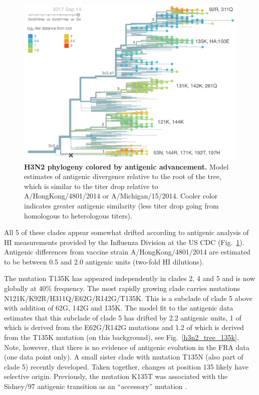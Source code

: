 \documentclass[11pt,oneside,letterpaper]{article}
\newcommand{\FIG}[1]{Fig.~\ref{#1}}
\begin{document}
\clearpage
\begin{figure}[h!]
  \centering
  \includegraphics[width=1.0\textwidth]{../figures/sep-2017/h3n2_tree_titer_model.png}
  \caption{\textbf{H3N2 phylogeny colored by antigenic advancement.}
  Model estimates of antigenic divergence relative to the root of the tree, which is similar to the titer drop relative to A/HongKong/4801/2014 or A/Michigan/15/2014.
  Cooler color indicates greater antigenic similarity (less titer drop going from homologous to heterologous titers).
  }
  \label{h3n2_tree_titer_model}
\end{figure}


All 5 of these clades appear somewhat drifted according to antigenic
analysis \cite{neher2015prediction} of HI measurements provided by the Influenza Division at the US CDC (\FIG{h3n2_tree_titer_model}).
Antigenic differences from vaccine strain A/HongKong/4801/2014 are estimated to be between 0.5 and 2.0 antigenic units (two-fold HI dilutions).

The mutation T135K has appeared independently in clades 2, 4 and 5 and is now globally at 40\% frequency.
The most rapidly growing clade carries mutations
N121K/K92R/H311Q/E62G/R142G/T135K. This is a subclade of clade 5 above
with addition of 62G, 142G and 135K. The model fit to the antigenic data
estimates that this subclade of clade 5 has drifted by 2.2 antigenic
units, 1 of which is derived from the E62G/R142G mutations and 1.2 of which is derived from
the T135K mutation (on this background), see \FIG{h3n2_tree_135k}.
Note, however, that there
is no evidence of antigenic evolution in the FRA data (one data point
only). A small sister clade with mutation T135N (also part of clade 5)
recently developed. Taken together, changes at position 135 likely have
selective origin.
Previously, the mutation K135T was associated with the Sidney/97 antigenic transition as an ``accessory'' mutation \cite{koel2013substitutions}.
\end{document}
